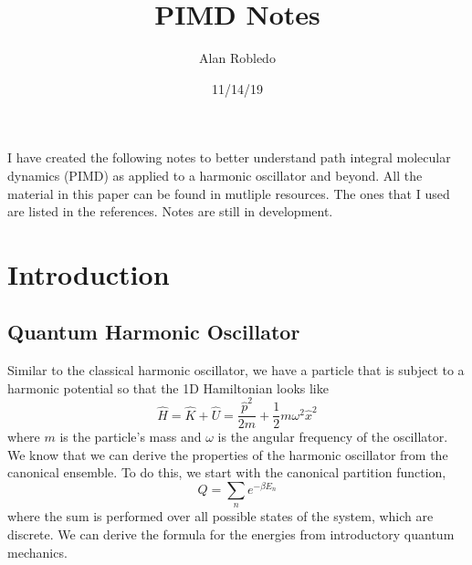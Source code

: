 \documentclass{article}
\title{PIMD Notes}
\date{11/14/19}
\author{Alan Robledo}
\newcommand{\be}{\begin{equation}}
\newcommand{\ee}{\end{equation}}
\begin{document}
\maketitle

I have created the following notes to better understand path integral molecular dynamics (PIMD) as applied to a harmonic oscillator and beyond. All the material in this paper can be found in mutliple resources. The ones that I used are listed in the references. Notes are still in development.

\section{Introduction}
\subsection{Quantum Harmonic Oscillator}
Similar to the classical harmonic oscillator, we have a particle that is subject to a harmonic potential so that the 1D Hamiltonian looks like
\be \label{eq:harm_osc}
  \hat{H} = \hat{K} + \hat{U} = \frac{\hat{p}^2}{2m} + \frac{1}{2}m \omega^2\hat{x}^2
\ee
where $m$ is the particle's mass and $\omega$ is the angular frequency of the oscillator.
We know that we can derive the properties of the harmonic oscillator from the canonical ensemble. To do this, we start with the canonical partition function,
\be \label{eq:classical_part_func}
  Q = \sum_n e^{-\beta E_n}
\ee
where the sum is performed over all possible states of the system, which are discrete.\cite{tuckerman}
We can derive the formula for the energies from introductory quantum mechanics.
\end{document}

